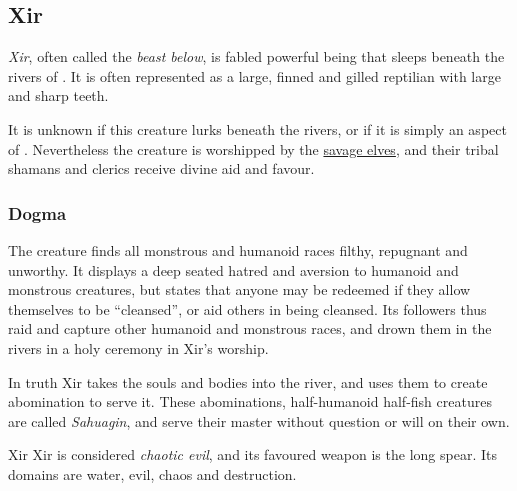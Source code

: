 \subsection{Xir}
\label{sec:Xir}

\emph{Xir}, often called the \emph{beast below}, is fabled powerful being that
sleeps beneath the rivers of . It is often represented as a
large, finned and gilled reptilian with large and sharp teeth.

It is unknown if this creature lurks beneath the rivers, or if it is simply an
aspect of . Nevertheless the creature is worshipped by the
\hyperref[sec:Savage Elves]{savage elves}, and their tribal shamans and clerics
receive divine aid and favour.

\subsubsection{Dogma}

The creature finds all monstrous and humanoid races filthy, repugnant and
unworthy. It displays a deep seated hatred and aversion to humanoid and
monstrous creatures, but states that anyone may be redeemed if they allow
themselves to be ``cleansed'', or aid others in being cleansed. Its followers
thus raid and capture other humanoid and monstrous races, and drown them in
the rivers in a holy ceremony in Xir's worship.

In truth Xir takes the souls and bodies into the river, and uses them to create
abomination to serve it. These abominations, half-humanoid half-fish creatures
are called \emph{Sahuagin}, and serve their master without question or will on
their own.

\begin{35e}{Xir}
  Xir is considered \emph{chaotic evil}, and its favoured weapon is the long
  spear. Its domains are water, evil, chaos and destruction.
\end{35e}
